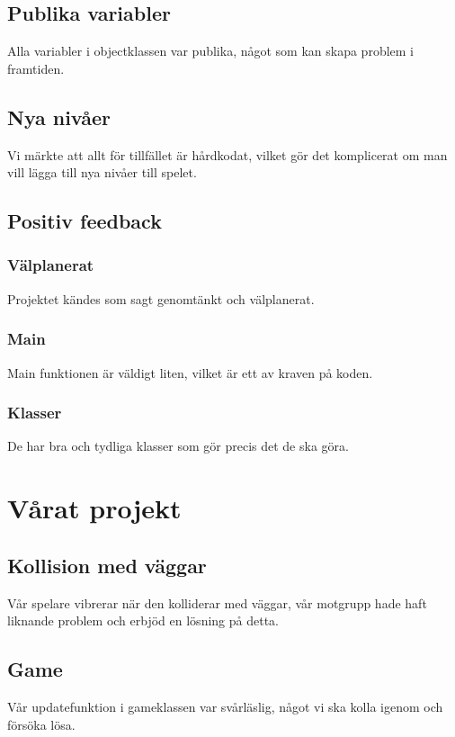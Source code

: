 \documentclass{TDP005mall}
\begin{document}
\subsection{Publika variabler}
Alla variabler i objectklassen var publika, något som kan skapa problem i
framtiden.

\subsection{Nya nivåer}
Vi märkte att allt för tillfället är hårdkodat, vilket gör det komplicerat om
man vill lägga till nya nivåer till spelet.

\subsection{Positiv feedback}

\subsubsection{Välplanerat}
Projektet kändes som sagt genomtänkt och välplanerat.

\subsubsection{Main}
Main funktionen är väldigt liten, vilket är ett av kraven på koden.

\subsubsection{Klasser}
De har bra och tydliga klasser som gör precis det de ska göra.

\section{Vårat projekt}

\subsection{Kollision med väggar}
Vår spelare vibrerar när den kolliderar med väggar, vår motgrupp hade haft
liknande problem och erbjöd en lösning på detta.

\subsection{Game}
Vår updatefunktion i gameklassen var svårläslig, något vi ska kolla igenom och
försöka lösa.
\end{document}
